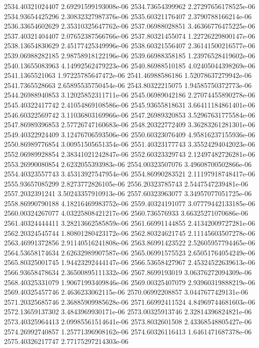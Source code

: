 {2534.40321024407 2.69291599193008e-06
2534.73654399962 2.27297656178525e-06
2534.93654425296 2.30832327987376e-06
2535.60321176407 2.3790788166214e-06
2536.33654602629 2.35310325647762e-06
2537.06988028851 3.46366776475225e-06
2537.40321404407 2.07652387566766e-06
2537.80321455074 1.22726229800147e-06
2538.13654830629 2.45177425349996e-06
2538.60321556407 2.36141500216577e-06
2539.06988282185 2.98758918122196e-06
2539.66988358185 1.23976528419602e-06
2540.13655083963 4.14992562479223e-06
2540.86988510185 4.02405044398269e-06
2541.1365521063 1.97225785647472e-06
2541.46988586186 1.52078637279942e-06
2541.7365528663 2.65895535750454e-06
2543.80322215075 1.94585750372773e-06
2544.26988940853 3.12025852311711e-06
2545.06989042186 2.27074455890278e-06
2545.40322417742 2.41054869108586e-06
2545.93655818631 3.66411184861401e-06
2546.60322569742 3.11036803169966e-06
2547.26989320853 3.52967631775584e-06
2547.86989396853 2.57726747160683e-06
2548.20322772409 3.36283261281301e-06
2549.40322924409 3.12476706593506e-06
2550.60323076409 4.95816237155936e-06
2550.86989776854 3.00951505651354e-06
2551.40323177743 3.35524294042023e-06
2552.06989928854 2.38341021242847e-06
2552.60323329743 2.12497482726281e-06
2553.26990080854 2.6232055393983e-06
2554.00323507076 3.49608700502866e-06
2554.40323557743 3.45313927547954e-06
2554.86990283521 2.11197918748417e-06
2555.93657085299 2.8273772826105e-06
2556.20323785743 2.5447547239481e-06
2557.2032391241 3.50243357910913e-06
2557.60323963077 3.34957077051725e-06
2558.86990790188 4.18216469983752e-06
2559.40324191077 3.07779442133185e-06
2560.00324267077 4.03225808421217e-06
2560.736576933 3.66325271070686e-06
2561.40324444411 3.28213662585859e-06
2561.66991144855 2.41342009727281e-06
2562.20324545744 1.80801280423172e-06
2562.80324621745 2.11145603507278e-06
2563.46991372856 2.91140516241808e-06
2563.86991423522 2.52605957794465e-06
2564.53658174634 2.62632989907587e-06
2565.06991575523 2.65051764054249e-06
2565.80325001745 1.94423292444147e-06
2566.53658427967 2.45324522639613e-06
2566.93658478634 2.36500895111332e-06
2567.8699193019 3.06376272094309e-06
2568.40325331079 1.90671993409846e-06
2569.00325407079 2.93960319888219e-06
2569.40325457746 2.4636233062115e-06
2570.06992208857 3.0447677429131e-06
2571.20325685746 2.36885909985628e-06
2571.66992411524 4.84969744681603e-06
2572.13659137302 3.4843969930171e-06
2573.00325913746 2.32814396824821e-06
2573.40325964413 2.09985561514641e-06
2573.8032601508 2.43368548805427e-06
2574.26992740857 1.25771396908162e-06
2574.60326116413 1.6461471687378e-06
2575.40326217747 2.77175297214303e-06
}
